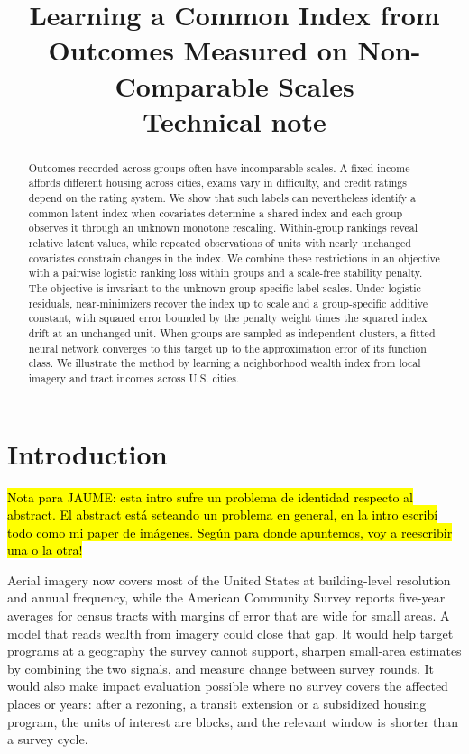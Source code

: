 \documentclass[11pt]{article}
\title{\textbf{Learning a Common Index from Outcomes Measured on Non-Comparable Scales}\\[0.3em]
\large Technical note}
\date{}
\theoremstyle{remark}
\begin{document}
\maketitle
\vspace{-2em}

\begin{abstract}
\noindent Outcomes recorded across groups often have incomparable scales. A fixed income affords different housing across cities, exams vary in difficulty, and credit ratings depend on the rating system. We show that such labels can nevertheless identify a common latent index when covariates determine a shared index and each group observes it through an unknown monotone rescaling. Within-group rankings reveal relative latent values, while repeated observations of units with nearly unchanged covariates constrain changes in the index. We combine these restrictions in an objective with a pairwise logistic ranking loss within groups and a scale-free stability penalty. The objective is invariant to the unknown group-specific label scales. Under logistic residuals, near-minimizers recover the index up to scale and a group-specific additive constant, with squared error bounded by the penalty weight times the squared index drift at an unchanged unit. When groups are sampled as independent clusters, a fitted neural network converges to this target up to the approximation error of its function class. We illustrate the method by learning a neighborhood wealth index from local imagery and tract incomes across U.S. cities.
\end{abstract}

\section*{Introduction}

\hl{Nota para JAUME: esta intro sufre un problema de identidad respecto al abstract. El abstract está seteando un problema en general, en la intro escribí todo como mi paper de imágenes. Según para donde apuntemos, voy a reescribir una o la otra!}

Aerial imagery now covers most of the United States at building-level resolution and annual frequency, while the American Community Survey reports five-year averages for census tracts with margins of error that are wide for small areas. A model that reads wealth from imagery could close that gap. It would help target programs at a geography the survey cannot support, sharpen small-area estimates by combining the two signals, and measure change between survey rounds. It would also make impact evaluation possible where no survey covers the affected places or years: after a rezoning, a transit extension or a subsidized housing program, the units of interest are blocks, and the relevant window is shorter than a survey cycle.
\end{document}
